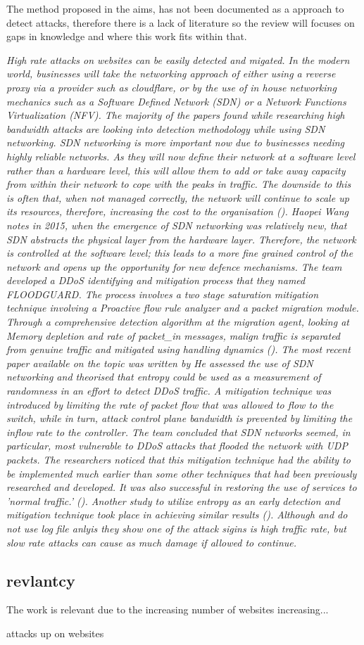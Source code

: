 The method proposed in the aims, has not been documented as a approach to detect attacks, therefore there is a lack of literature so the review will focuses on gaps in knowledge and where this work fits within that.

\textit{High rate attacks on websites can be easily detected and migated.  In the modern world, businesses will take the networking approach of either using a reverse proxy via a provider such as cloudflare, or by the use of in house networking mechanics such as a Software Defined Network (SDN) or a Network Functions Virtualization (NFV). The majority of the papers found while researching high bandwidth attacks are looking into detection methodology while using SDN networking. SDN networking is more important now due to businesses needing highly reliable networks.  As they will now define their network at a software level rather than a hardware level, this will allow them to add or take away capacity from within their network to cope with the peaks in traffic. The downside to this is often that, when not managed correctly, the network will continue to scale up its resources, therefore, increasing the cost to the organisation (\cite{Techbeacon}). 
Haopei Wang notes in 2015, when the emergence of SDN networking was relatively new, that SDN abstracts the physical layer from the hardware layer. Therefore, the network is controlled at the software level; this leads to a more fine grained control of the network and opens up the opportunity for new defence mechanisms. The team developed a DDoS identifying and mitigation process that they named FLOODGUARD. The process involves a two stage saturation mitigation technique involving a Proactive flow rule analyzer and a packet migration module. Through a comprehensive detection algorithm at the migration agent, looking at Memory depletion and rate of packet\_in messages, malign traffic is separated from genuine traffic and mitigated using handling dynamics (\cite{7266854}).
The most recent paper available on the topic was written by \citeauthor{ahalawat2019entropy} He assessed the use of SDN networking and theorised that entropy could be used as a measurement of randomness in an effort to detect DDoS traffic. A mitigation technique was introduced by limiting the rate of packet flow that was allowed to flow to the switch, while in turn, attack control plane bandwidth is prevented by limiting the inflow rate to the controller.  The team concluded that SDN networks seemed, in particular, most vulnerable to DDoS attacks that flooded the network with UDP packets. The researchers noticed that this mitigation technique had the ability to be implemented much earlier than some other techniques that had been previously researched and developed. It was also successful in restoring the use of services to 'normal traffic.' (\cite{ahalawat2019entropy}). Another study to utilize entropy as an early detection and mitigation technique took place in \citeyear{kumar2018safety} achieving similar results (\cite{kumar2018safety}). Although \citeauthor{ahalawat2019entropy} and \citeauthor{kumar2018safety} do not use log file anlyis they show one of the  attack sigins is high traffic rate, but slow rate attacks can cause as much damage if allowed to continue.
}
\subsection{revlantcy}
The work is relevant due to the increasing number of websites increasing...

attacks up on websites